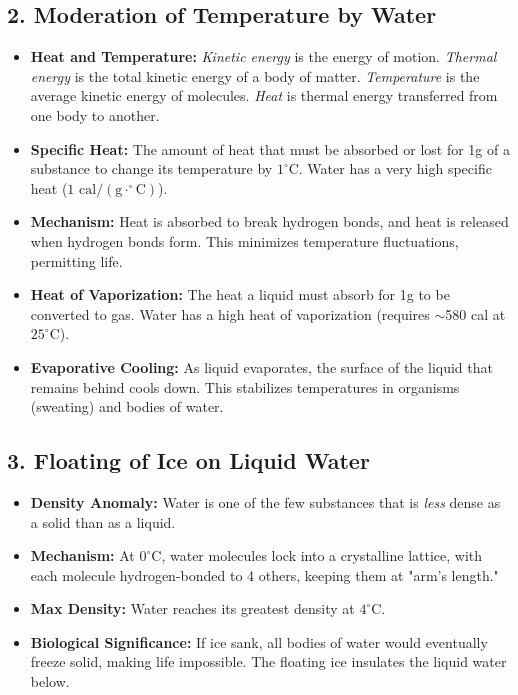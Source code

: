 \documentclass[11pt, a4paper]{article}
\begin{document}
\subsection*{2. Moderation of Temperature by Water}
\begin{itemize}
    \item \textbf{Heat and Temperature:} \textit{Kinetic energy} is the energy of motion. \textit{Thermal energy} is the total kinetic energy of a body of matter. \textit{Temperature} is the average kinetic energy of molecules. \textit{Heat} is thermal energy transferred from one body to another.
    \item \textbf{Specific Heat:} The amount of heat that must be absorbed or lost for 1g of a substance to change its temperature by $1^\circ\text{C}$. Water has a very high specific heat ($1 \text{ cal}/(\text{g}\cdot^\circ\text{C})$).
    \item \textbf{Mechanism:} Heat is absorbed to break hydrogen bonds, and heat is released when hydrogen bonds form. This minimizes temperature fluctuations, permitting life.
    \item \textbf{Heat of Vaporization:} The heat a liquid must absorb for 1g to be converted to gas. Water has a high heat of vaporization (requires $\sim$580 cal at $25^\circ\text{C}$).
    \item \textbf{Evaporative Cooling:} As liquid evaporates, the surface of the liquid that remains behind cools down. This stabilizes temperatures in organisms (sweating) and bodies of water.
\end{itemize}

\subsection*{3. Floating of Ice on Liquid Water}
\begin{itemize}
    \item \textbf{Density Anomaly:} Water is one of the few substances that is \textit{less} dense as a solid than as a liquid.
    \item \textbf{Mechanism:} At $0^\circ\text{C}$, water molecules lock into a crystalline lattice, with each molecule hydrogen-bonded to 4 others, keeping them at "arm's length."
    \item \textbf{Max Density:} Water reaches its greatest density at \textbf{$4^\circ\text{C}$}.
    \item \textbf{Biological Significance:} If ice sank, all bodies of water would eventually freeze solid, making life impossible. The floating ice insulates the liquid water below.
\end{itemize}
\end{document}
